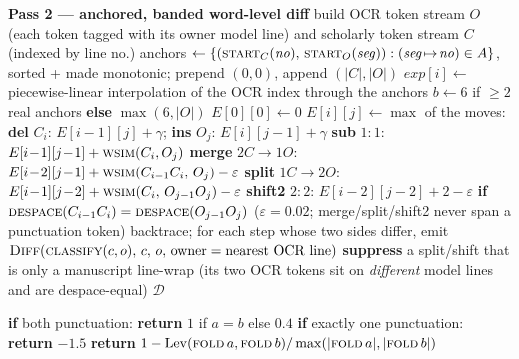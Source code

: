 \begin{algorithm}[htbp]
\begin{algorithmic}[1]
    \Statex \textbf{Pass 2 --- anchored, banded word-level diff}
    \State build OCR token stream $O$ (each token tagged with its owner model line) and scholarly
           token stream $C$ (indexed by line no.)
    \State anchors $\gets \{(\textsc{start}_C(\mathit{no}),\, \textsc{start}_O(\mathit{seg})) :
           (\mathit{seg}\!\mapsto\!\mathit{no})\in A\}$, sorted + made monotonic; prepend $(0,0)$, append $(|C|,|O|)$
    \State $\mathit{exp}[i] \gets$ piecewise-linear interpolation of the OCR index through the anchors
    \State $b \gets 6$ if $\ge 2$ real anchors \textbf{else} $\max(6,|O|)$ 
    \State $E[0][0]\gets 0$
      \State $E[i][j] \gets \max$ of the moves:
      \State \quad \textbf{del} $C_i$: $E[i\!-\!1][j]+\gamma$; \quad \textbf{ins} $O_j$: $E[i][j\!-\!1]+\gamma$
      \State \quad \textbf{sub} $1\!:\!1$: $E[i\!-\!1][j\!-\!1] + \textsc{wsim}(C_i,O_j)$
      \State \quad \textbf{merge} $2C\!\to\!1O$: $E[i\!-\!2][j\!-\!1] + \textsc{wsim}(C_{i-1}C_i,\,O_j) - \varepsilon$
      \State \quad \textbf{split} $1C\!\to\!2O$: $E[i\!-\!1][j\!-\!2] + \textsc{wsim}(C_i,\,O_{j-1}O_j) - \varepsilon$
      \State \quad \textbf{shift2} $2\!:\!2$: $E[i\!-\!2][j\!-\!2] + 2 - \varepsilon$ \textbf{if}
             $\textsc{despace}(C_{i-1}C_i)=\textsc{despace}(O_{j-1}O_j)$
      \State \quad ($\varepsilon=0.02$; merge/split/shift2 never span a punctuation token)
    \EndFor
    \State backtrace; for each step whose two sides differ, emit
           $\textsc{Diff}(\textsc{classify}(c,o),\, c,\, o,\, \text{owner}=\text{nearest OCR line})$
    \State \textbf{suppress} a split/shift that is only a manuscript line-wrap (its two OCR tokens sit on
           \emph{different} model lines and are despace-equal)
    \State \Return $\mathcal{D}$

    \Statex\hrulefill
     
      \State \textbf{if} both punctuation: \textbf{return} $1$ if $a=b$ else $0.4$
      \State \textbf{if} exactly one punctuation: \textbf{return} $-1.5$ 
      \State \textbf{return} $1 - \mathrm{Lev}(\textsc{fold}\,a,\textsc{fold}\,b)/\max(|\textsc{fold}\,a|,|\textsc{fold}\,b|)$
    \EndFunction
  \end{algorithmic}
\end{algorithm}

